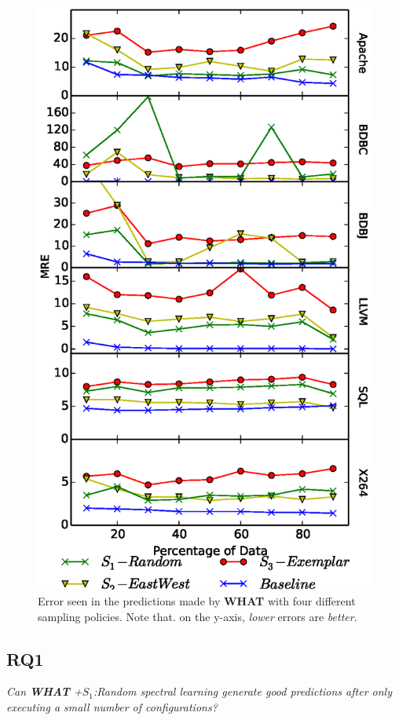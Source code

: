 \documentclass{sig-alternative}
\newcommand{\what}{{\bf WHAT }}
\begin{document}
\begin{figure}[!t]
\includegraphics[width=0.9\linewidth]{Figures/SamplingAccuracy.eps}
\caption{Error seen in the predictions made by \what with four different
sampling policies. Note that. on the y-axis,  {\em lower} errors are {\em better}.}
\label{fig:sampling_accuracy}
\end{figure}

\subsection{RQ1}
{\em Can  \what  +$S_1$:Random spectral learning generate good predictions after only
executing a small number of configurations?}
\end{document}

